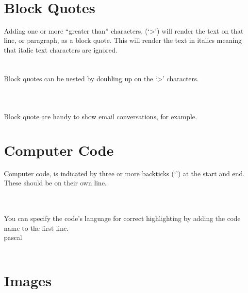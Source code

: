 \noindent{}\\

\section{Block Quotes}

Adding one or more ``greater than'' characters, (`>') will render the text on that line, or paragraph, as a block quote. This will render the text in italics meaning that italic text characters are ignored.\\

\noindent{}\\
\\

Block quotes can be nested by doubling up on the `>' characters.\\

\noindent{}\\
\\
\\

Block quote are handy to show email conversations, for example.

\section{Computer Code}

Computer code, is indicated by three or more backticks (`\textasciigrave') at the start and end. These should be on their own line.\\

\noindent\code{\textasciigrave\textasciigrave\textasciigrave}\\
\\
\code{\textasciigrave\textasciigrave\textasciigrave}

You can specify the code's language for correct highlighting by adding the code name to the first line.\\

\noindent\code{\textasciigrave\textasciigrave\textasciigrave}pascal\\
\\
\code{\textasciigrave\textasciigrave\textasciigrave}

\section{Images}

